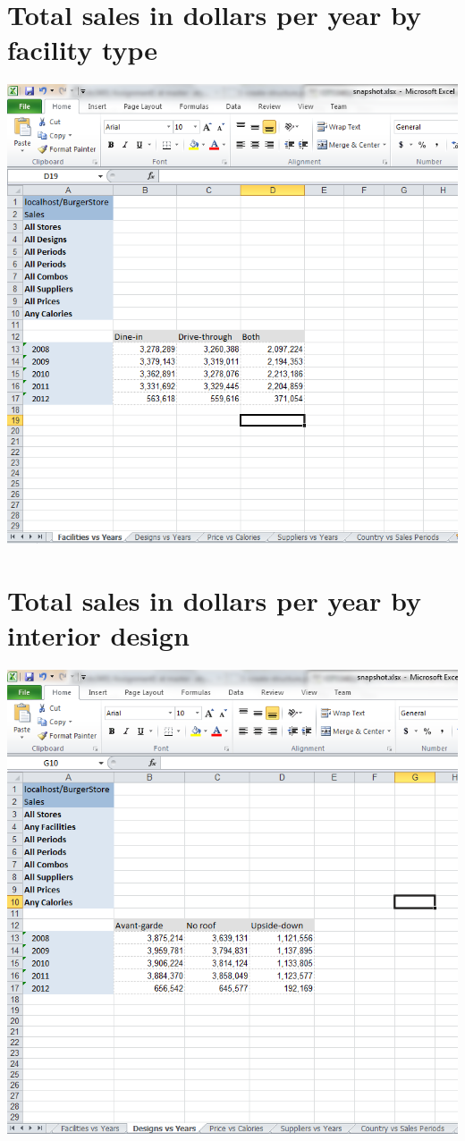 \documentclass[11pt, a4paper]{article}
\begin{document}
\section{Total sales in dollars per year by facility type} 
\includegraphics[width=15cm]{diagrams/FacilitiesVsYears}

\section{Total sales in dollars per year by interior design}
\includegraphics[width=15cm]{diagrams/DesignsVsYears}
\end{document}
